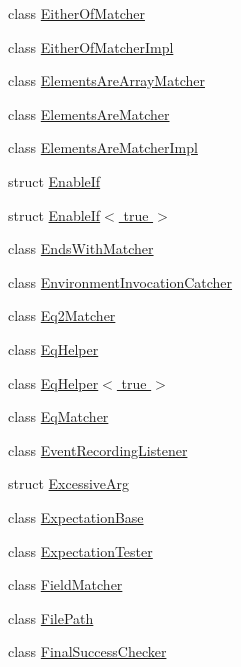 \begin{DoxyCompactItemize}
\item 
class \hyperlink{classtesting_1_1internal_1_1EitherOfMatcher}{Either\+Of\+Matcher}
\item 
class \hyperlink{classtesting_1_1internal_1_1EitherOfMatcherImpl}{Either\+Of\+Matcher\+Impl}
\item 
class \hyperlink{classtesting_1_1internal_1_1ElementsAreArrayMatcher}{Elements\+Are\+Array\+Matcher}
\item 
class \hyperlink{classtesting_1_1internal_1_1ElementsAreMatcher}{Elements\+Are\+Matcher}
\item 
class \hyperlink{classtesting_1_1internal_1_1ElementsAreMatcherImpl}{Elements\+Are\+Matcher\+Impl}
\item 
struct \hyperlink{structtesting_1_1internal_1_1EnableIf}{Enable\+If}
\item 
struct \hyperlink{structtesting_1_1internal_1_1EnableIf_3_01true_01_4}{Enable\+If$<$ true $>$}
\item 
class \hyperlink{classtesting_1_1internal_1_1EndsWithMatcher}{Ends\+With\+Matcher}
\item 
class \hyperlink{classtesting_1_1internal_1_1EnvironmentInvocationCatcher}{Environment\+Invocation\+Catcher}
\item 
class \hyperlink{classtesting_1_1internal_1_1Eq2Matcher}{Eq2\+Matcher}
\item 
class \hyperlink{classtesting_1_1internal_1_1EqHelper}{Eq\+Helper}
\item 
class \hyperlink{classtesting_1_1internal_1_1EqHelper_3_01true_01_4}{Eq\+Helper$<$ true $>$}
\item 
class \hyperlink{classtesting_1_1internal_1_1EqMatcher}{Eq\+Matcher}
\item 
class \hyperlink{classtesting_1_1internal_1_1EventRecordingListener}{Event\+Recording\+Listener}
\item 
struct \hyperlink{structtesting_1_1internal_1_1ExcessiveArg}{Excessive\+Arg}
\item 
class \hyperlink{classtesting_1_1internal_1_1ExpectationBase}{Expectation\+Base}
\item 
class \hyperlink{classtesting_1_1internal_1_1ExpectationTester}{Expectation\+Tester}
\item 
class \hyperlink{classtesting_1_1internal_1_1FieldMatcher}{Field\+Matcher}
\item 
class \hyperlink{classtesting_1_1internal_1_1FilePath}{File\+Path}
\item 
class \hyperlink{classtesting_1_1internal_1_1FinalSuccessChecker}{Final\+Success\+Checker}

\end{DoxyCompactItemize}
